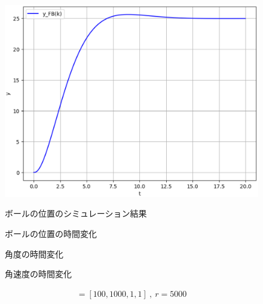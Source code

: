 \documentclass[a4paper,10.5pt]{ltjsarticle}
\begin{document}
\begin{figure}[h]
  \vspace{-30pt}
  \centering
  \begin{minipage}{0.4\linewidth}
    \centering
    \includegraphics[scale=0.35]{figure18.eps}
    \caption{ボールの位置のシミュレーション結果}
    \label{fig:figure24}
  \end{minipage}
  \begin{minipage}[h]{0.4\linewidth}
    \centering
    
    \vspace{-30pt}\caption{ボールの位置の時間変化}
    \label{fig:figure25}
  \end{minipage}
  \begin{minipage}[h]{0.4\linewidth}
    \centering
    
    \vspace{-30pt}\caption{角度の時間変化}
    \label{fig:figure26}
  \end{minipage}
  \begin{minipage}[h]{0.4\linewidth}
    \centering
    
    \vspace{-30pt}\caption{角速度の時間変化}
    \label{fig:figure27}
  \end{minipage}
\end{figure}
\begin{align}
  [q_1,q_2,q_3,q_4]=[100,1000,1,1]\ ,\ r=5000
\end{align}
\end{document}
